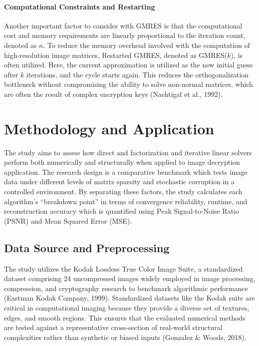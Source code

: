 \documentclass[11pt]{article}
\begin{document}
\paragraph{Computational Constraints and Restarting}
Another important factor to consider with GMRES is that the computational cost and memory requirements are linearly proportional to the iteration count, denoted as $n$. To reduce the memory overhead involved with the computation of high-resolution image matrices, Restarted GMRES, denoted as GMRES($k$), is often utilized. Here, the current approximation is utilized as the new initial guess after $k$ iterations, and the cycle starts again. This reduces the orthogonalization bottleneck without compromising the ability to solve non-normal matrices, which are often the result of complex encryption keys (Nachtigal et al., 1992).

\section{Methodology and Application}

The study aims to assess how direct and factorization and iterative linear solvers perform both numerically and structurally when applied to image decryption application. The research design is a comparative benchmark which tests image data under different levels of matrix sparsity and stochastic corruption in a controlled environment. By separating these factors, the study calculates each algorithm's ``breakdown point'' in terms of convergence reliability, runtime, and reconstruction accuracy which is quantified using Peak Signal-to-Noise Ratio (PSNR) and Mean Squared Error (MSE).

\subsection{Data Source and Preprocessing}

The study utilizes the Kodak Lossless True Color Image Suite, a standardized dataset comprising 24 uncompressed images widely employed in image processing, compression, and cryptography research to benchmark algorithmic performance (Eastman Kodak Company, 1999). Standardized datasets like the Kodak suite are critical in computational imaging because they provide a diverse set of textures, edges, and smooth regions. This ensures that the evaluated numerical methods are tested against a representative cross-section of real-world structural complexities rather than synthetic or biased inputs (Gonzalez \& Woods, 2018). 
\end{document}
